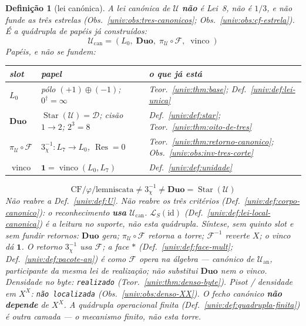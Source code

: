 \documentclass[11pt,a4paper]{article}
\newtheorem{definicao}[teorema]{Definição}
\begin{document}
\begin{definicao}[lei canónica]\label{univ:def:lei-canonica}
A lei canónica de \(\mathcal{U}\) \textbf{não} é Lei~8, não é
\(1/3\), e não funde as três estrelas
(Obs.~\ref{univ:obs:tres-canonicos}; Obs.~\ref{univ:obs:cf-estrela}).
É a quádrupla de papéis já construídos:
\[
\boxed{\;
\mathcal{U}_{\mathrm{can}}
=(L_0,\;\mathbf{Duo},\;\pi_{\mathcal{U}}\circ\mathcal{F},\;\operatorname{vinco})
\;}
\]
Papéis, e não se fundem:
\begin{center}\small
\begin{tabular}{@{}llp{}@{}}
\toprule
slot & papel & o que já está \\
\midrule
\(L_0\)
  & pólo \((+1)\oplus(-1)\); \(0^{\dagger}=\infty\)
  & Teor.~\ref{univ:thm:base}; Def.~\ref{univ:def:lei-unica} \\
\(\mathbf{Duo}\)
  & \(\operatorname{Star}(\mathcal{U})=\mathcal{D}\);
    cisão \(1\to 2\); \(2^{3}=8\)
  & Def.~\ref{univ:def:star}; Teor.~\ref{univ:thm:oito-de-tres} \\
\(\pi_{\mathcal{U}}\circ\mathcal{F}\)
  & \(3^{-1}_{\chi}\colon L_7\to L_0\), \(\operatorname{Res}=0\)
  & Teor.~\ref{univ:thm:retorno-canonico};
    Obs.~\ref{univ:obs:inv-tres-corte} \\
\(\operatorname{vinco}\)
  & \(\mathbf{1}=\operatorname{vinco}(L_0,L_7)\)
  & Def.~\ref{univ:def:unidade} \\
\bottomrule
\end{tabular}
\end{center}
\[
\boxed{\;
\mathrm{CF}/\varphi/\text{lemniscata}
\neq
3^{-1}_{\chi}
\neq
\mathbf{Duo}
=\operatorname{Star}(\mathcal{U})
\;}
\]
Não reabre a Def.~\ref{univ:def:U}. Não reabre os três critérios
(Def.~\ref{univ:def:corpo-canonico}): o reconhecimento
\textbf{usa} \(\mathcal{U}_{\mathrm{can}}\).
\(\mathcal{L}_S(\mathrm{id})\) (Def.~\ref{univ:def:lei-local-canonica})
é a leitura no suporte, não esta quádrupla.
Síntese, sem quinto slot e sem fundir retornos:
\(\mathbf{Duo}\) gera; \(\pi_{\mathcal{U}}\circ\mathcal{F}\)
retorna a torre; \(\mathcal{F}^{-1}\) reverte \(X\);
o vinco dá \(\mathbf{1}\).
O retorno \(3^{-1}_{\chi}\) usa \(\mathcal{F}\);
a face \(*\) (Def.~\ref{univ:def:face-mult};
Def.~\ref{univ:def:pacote-an}) é como
\(\mathcal{F}\) opera na álgebra --- canónico de
\(\mathcal{U}_{\mathrm{an}}\), participante da mesma
lei de realização; não substitui \(\mathbf{Duo}\)
nem o vinco.
Densidade no byte: \texttt{realizado}
(Teor.~\ref{univ:thm:denso-byte}).
Pisot / densidade em \(X^{X}\): \texttt{não localizada}
(Obs.~\ref{univ:obs:denso-XX}).
O fecho canónico \textbf{não depende} de \(X^{X}\).
A quádrupla operacional finita
(Def.~\ref{univ:def:quadrupla-finita})
é outra camada --- o mecanismo finito, não esta
torre.
\end{definicao}
\end{document}
